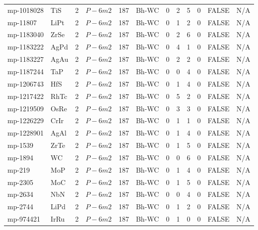 {\begin{longtable}{llcccccccccc}
    mp-1018028 & TiS   & 2     & $P-6m2$ & 187   & Bh-WC & 0     & 2     & 5     & 0     & FALSE & N/A \\
    mp-11807 & LiPt  & 2     & $P-6m2$ & 187   & Bh-WC & 0     & 1     & 2     & 0     & FALSE & N/A \\
    mp-1183040 & ZrSe  & 2     & $P-6m2$ & 187   & Bh-WC & 0     & 2     & 6     & 0     & FALSE & N/A \\
    mp-1183222 & AgPd  & 2     & $P-6m2$ & 187   & Bh-WC & 0     & 4     & 1     & 0     & FALSE & N/A \\
    mp-1183227 & AgAu  & 2     & $P-6m2$ & 187   & Bh-WC & 0     & 2     & 2     & 0     & FALSE & N/A \\
    mp-1187244 & TaP   & 2     & $P-6m2$ & 187   & Bh-WC & 0     & 0     & 4     & 0     & FALSE & N/A \\
    mp-1206743 & HfS   & 2     & $P-6m2$ & 187   & Bh-WC & 0     & 1     & 4     & 0     & FALSE & N/A \\
    mp-1217422 & RhTc  & 2     & $P-6m2$ & 187   & Bh-WC & 0     & 5     & 2     & 0     & FALSE & N/A \\
    mp-1219509 & OsRe  & 2     & $P-6m2$ & 187   & Bh-WC & 0     & 3     & 3     & 0     & FALSE & N/A \\
    mp-1226229 & CrIr  & 2     & $P-6m2$ & 187   & Bh-WC & 0     & 1     & 1     & 0     & FALSE & N/A \\
    mp-1228901 & AgAl  & 2     & $P-6m2$ & 187   & Bh-WC & 0     & 1     & 4     & 0     & FALSE & N/A \\
    mp-1539 & ZrTe  & 2     & $P-6m2$ & 187   & Bh-WC & 0     & 1     & 5     & 0     & FALSE & N/A \\
    mp-1894 & WC    & 2     & $P-6m2$ & 187   & Bh-WC & 0     & 0     & 6     & 0     & FALSE & N/A \\
    mp-219 & MoP   & 2     & $P-6m2$ & 187   & Bh-WC & 0     & 1     & 4     & 0     & FALSE & N/A \\
    mp-2305 & MoC   & 2     & $P-6m2$ & 187   & Bh-WC & 0     & 1     & 5     & 0     & FALSE & N/A \\
    mp-2634 & NbN   & 2     & $P-6m2$ & 187   & Bh-WC & 0     & 0     & 4     & 0     & FALSE & N/A \\
    mp-2744 & LiPd  & 2     & $P-6m2$ & 187   & Bh-WC & 0     & 1     & 2     & 0     & FALSE & N/A \\
    mp-974421 & IrRu  & 2     & $P-6m2$ & 187   & Bh-WC & 0     & 1     & 0     & 0     & FALSE & N/A \\

\end{longtable}}
